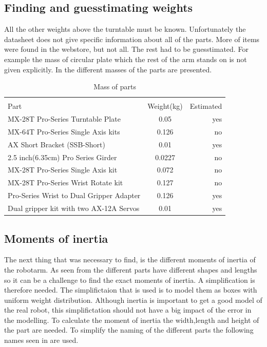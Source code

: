 \subsection*{Finding and guesstimating weights}
All the other weights above the turntable must be known. Unfortunately the datasheet does not give specific information about all of the parts. More of items were found in the webstore, but not all. The rest had to be guesstimated. For example the mass of circular plate which the rest of the arm stands on is not given explicitly. In  the different masses of the parts are presented. 
\begin{table}[h]
\centering
\caption{Mass of parts}
\label{table:partmass}
    \begin{tabular}{l c r}
        \hline \\[-1em]
        Part  &  Weight(kg) & Estimated\\
        \hline
        MX-28T Pro-Series Turntable Plate& 0.05 & yes\\
        MX-64T Pro-Series Single Axis kits& 0.126 & no\\
        AX Short Bracket (SSB-Short) & 0.01 & yes\\
        2.5 inch(6.35cm) Pro Series Girder & 0.0227 & no\\
        MX-28T Pro-Series Single Axis kit & 0.072 & no \\
        MX-28T Pro-Series Wrist Rotate kit & 0.127 & no\\
        Pro-Series Wrist to Dual Gripper Adapter & 0.126 & yes\\
        Dual gripper kit with two AX-12A Servos& 0.01 & yes\\
        \hline
    \end{tabular}
\end{table}


\subsection*{Moments of inertia}
The next thing that was necessary to find, is the different moments of inertia of the robotarm. As seen from  the different parts have different shapes and lengths so it can be a challenge to find the exact moments of inertia. A simplification is therefore needed. The simplifictaion that is used is to model them as boxes with uniform weight distribution. Although inertia is important to get a good model of the real robot, this simplifictation should not have a big impact of the error in the modelling. To calculate the moment of inertia the width,length and height of the part are needed. To simplify the naming of the different parts the following names seen in  are used.\\


